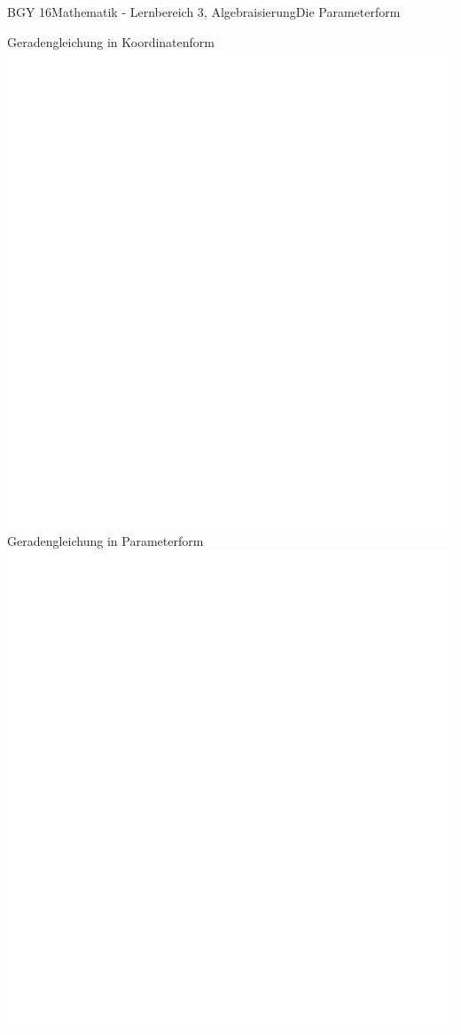\documentclass[oneside,openany,headings=optiontotoc,11pt,numbers=noenddot]{scrreprt}
\begin{document}
\begin{worksheet}{BGY 16}{Mathematik - Lernbereich 3, Algebraisierung}{Die Parameterform}
\begin{framed}
		\end{framed}
		\begin{framed}
			\noindent
			\tiny{\color{codegray}Geradengleichung in Koordinatenform}\\
			\includegraphics[scale=0.15]{../empty.jpg}\\
			\tiny{\color{codegray}Geradengleichung in Parameterform}\\
			\includegraphics[scale=0.37]{../empty.jpg}\\

\end{framed}
\end{worksheet}
\end{document}
